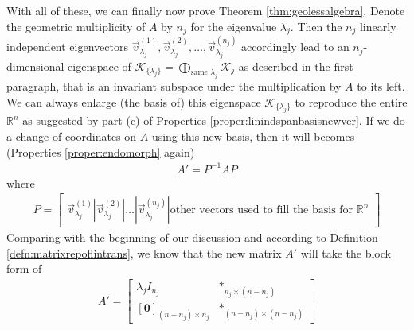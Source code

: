 With all of these, we can finally now prove Theorem \ref{thm:geolessalgebra}. Denote the geometric multiplicity of $A$ by $n_j$ for the eigenvalue $\lambda_j$. Then the $n_j$ linearly independent eigenvectors $\vec{v}_{\lambda_j}^{(1)}, \vec{v}_{\lambda_j}^{(2)}, \ldots, \vec{v}_{\lambda_j}^{(n_j)}$ accordingly lead to an $n_j$-dimensional eigenspace of $\mathcal{K}_{\{\lambda_j\}} = \bigoplus_{\text{same }\lambda_j} \mathcal{K}_j$ as described in the first paragraph, that is an invariant subspace under the multiplication by $A$ to its left. We can always enlarge (the basis of) this eigenspace $\mathcal{K}_{\{\lambda_j\}}$ to reproduce the entire $\mathbb{R}^n$ as suggested by part (c) of Properties \ref{proper:linindspanbasisnewver}. If we do a change of coordinates on $A$ using this new basis, then it will becomes (Properties \ref{proper:endomorph} again)
\begin{align*}
A' = P^{-1}AP
\end{align*}
where
\begin{align*}
P = \begin{bmatrix}
\vec{v}_{\lambda_j}^{(1)}|\vec{v}_{\lambda_j}^{(2)}|\ldots|\vec{v}_{\lambda_j}^{(n_j)}|\text{other vectors used to fill the basis for $\mathbb{R}^n$}
\end{bmatrix}
\end{align*}
Comparing with the beginning of our discussion and according to Definition \ref{defn:matrixrepoflintrans}, we know that the new matrix $A'$ will take the block form of
\begin{align*}
A' = 
\begin{bmatrix}
\lambda_j I_{n_j} & *_{n_j\times(n-n_j)} \\
[\textbf{0}]_{(n-n_j)\times n_j} & *_{(n-n_j)\times(n-n_j)}
\end{bmatrix}
\end{align*}
